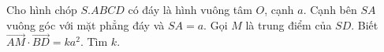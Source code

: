 \begin{ex}
Cho hình chóp $S.ABCD$ có đáy là hình vuông tâm $O$, cạnh $a$. Cạnh bên $SA$ vuông góc với mặt phẳng đáy và $SA=a$. Gọi $M$ là trung điểm của $SD$. Biết $\overrightarrow{AM}\cdot\overrightarrow{BD}=ka^2$. Tìm $k$.
\end{ex}
